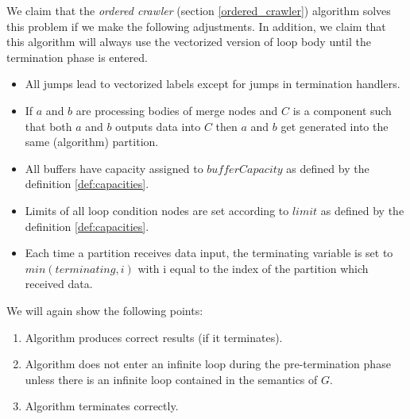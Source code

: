 %
%
%
%
%


We claim that the \emph{ordered crawler} (section \ref{ordered_crawler}) algorithm solves this problem if we make the following adjustments. In addition, we claim that this algorithm will always use the vectorized version of loop body until the termination phase is entered.
 \begin{itemize}
   \item All jumps lead to vectorized labels except for jumps in termination handlers.
   \item If $a$ and $b$ are processing bodies of merge nodes and $C$ is a component such that both $a$ and $b$ outputs data into $C$ then $a$ and $b$ get generated into the same (algorithm) partition.
   \item All buffers have capacity assigned to $bufferCapacity$ as defined by the definition \ref{def:capacities}.
   \item Limits of all loop condition nodes are set according to $limit$ as defined by the definition \ref{def:capacities}.
   \item Each time a partition receives data input, the terminating variable is set to $min(terminating,i)$ with i equal to the index of the partition which received data.
 \end{itemize}
We will again show the following points:
\begin{enumerate}
  \item Algorithm produces correct results (if it terminates).
  \item Algorithm does not enter an infinite loop during the pre-termination phase unless there is an infinite loop contained in the semantics of $G$.
  \item Algorithm terminates correctly.
\end{enumerate}
